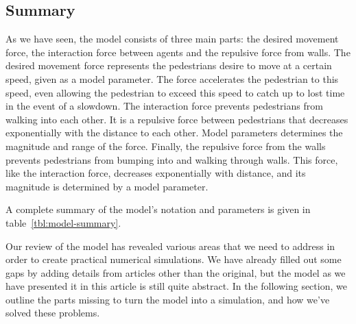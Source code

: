 \subsection{Summary}
As we have seen, the model consists of three main parts: the desired movement 
force, the interaction force between agents and the repulsive force from 
walls. The desired movement force represents the pedestrians desire to move at 
a certain speed, given as a model parameter. The force accelerates the 
pedestrian to this speed, even allowing the pedestrian to exceed this speed to 
catch up to lost time in the event of a slowdown. The interaction force 
prevents pedestrians from walking into each other. It is a repulsive force 
between pedestrians that decreases exponentially with the distance to each 
other. Model parameters determines the magnitude and range of the force. 
Finally, the repulsive force from the walls prevents pedestrians from bumping 
into and walking through walls. This force, like the interaction force, 
decreases exponentially with distance, and its magnitude is determined by a 
model parameter.

A complete summary of the model's notation and parameters is given in 
table~\ref{tbl:model-summary}.

Our review of the model has revealed various areas that we need to address in 
order to create practical numerical simulations. We have already filled out 
some gaps by adding details from articles other than the original, but the 
model as we have presented it in this article is still quite abstract. In the 
following section, we outline the parts missing to turn the model into a 
simulation, and how we've solved these problems.


